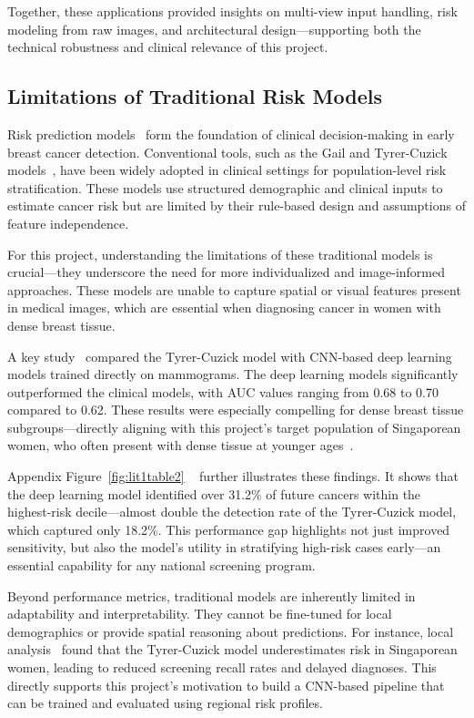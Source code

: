 \documentclass[12pt]{article}
\begin{document}
Together, these applications provided insights on multi-view input handling, risk modeling from raw images, and architectural design—supporting both the technical robustness and clinical relevance of this project.

\subsection{Limitations of Traditional Risk Models}

Risk prediction models~\cite{1} form the foundation of clinical decision-making in early breast cancer detection. Conventional tools, such as the Gail and Tyrer-Cuzick models~\cite{1}, have been widely adopted in clinical settings for population-level risk stratification. These models use structured demographic and clinical inputs to estimate cancer risk but are limited by their rule-based design and assumptions of feature independence.

For this project, understanding the limitations of these traditional models is crucial—they underscore the need for more individualized and image-informed approaches. These models are unable to capture spatial or visual features present in medical images, which are essential when diagnosing cancer in women with dense breast tissue.

A key study~\cite{1} compared the Tyrer-Cuzick model with CNN-based deep learning models trained directly on mammograms. The deep learning models significantly outperformed the clinical models, with AUC values ranging from 0.68 to 0.70 compared to 0.62. These results were especially compelling for dense breast tissue subgroups—directly aligning with this project’s target population of Singaporean women, who often present with dense tissue at younger ages~\cite{6}.

Appendix Figure~\ref{fig:lit1table2} ~\cite{1} further illustrates these findings. It shows that the deep learning model identified over 31.2\% of future cancers within the highest-risk decile—almost double the detection rate of the Tyrer-Cuzick model, which captured only 18.2\%. This performance gap highlights not just improved sensitivity, but also the model’s utility in stratifying high-risk cases early—an essential capability for any national screening program.

Beyond performance metrics, traditional models are inherently limited in adaptability and interpretability. They cannot be fine-tuned for local demographics or provide spatial reasoning about predictions. For instance, local analysis~\cite{6} found that the Tyrer-Cuzick model underestimates risk in Singaporean women, leading to reduced screening recall rates and delayed diagnoses. This directly supports this project’s motivation to build a CNN-based pipeline that can be trained and evaluated using regional risk profiles.
\end{document}
